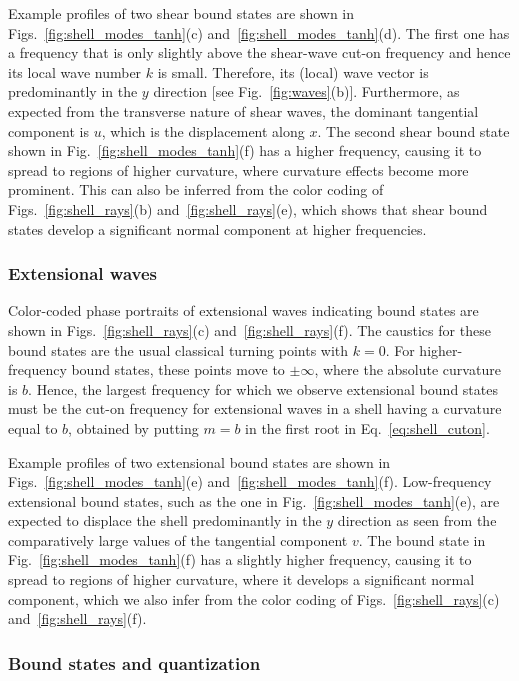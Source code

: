 Example profiles of two shear bound states are shown in Figs.~\ref{fig:shell_modes_tanh}(c) and~\ref{fig:shell_modes_tanh}(d).
The first one has a frequency that is only slightly above the shear-wave cut-on frequency and hence its local wave number $k$ is small.
Therefore, its (local) wave vector is predominantly in the $y$ direction [see Fig.~\ref{fig:waves}(b)].
Furthermore, as expected from the transverse nature of shear waves, the dominant tangential component is $u$, which is the displacement along $x$.
The second shear bound state shown in Fig.~\ref{fig:shell_modes_tanh}(f) has a higher frequency, causing it to spread to regions of higher curvature, where curvature effects become more prominent.
This can also be inferred from the color coding of Figs.~\ref{fig:shell_rays}(b) and~\ref{fig:shell_rays}(e), which shows that shear bound states develop a significant normal component at higher frequencies.

\subsubsection*{Extensional waves}

Color-coded phase portraits of extensional waves indicating bound states are shown in Figs.~\ref{fig:shell_rays}(c) and~\ref{fig:shell_rays}(f).
The caustics for these bound states are the usual classical turning points with $k=0$.
For higher-frequency bound states, these points move to $\pm \infty$, where the absolute curvature is $b$.
Hence, the largest frequency for which we observe extensional bound states must be the cut-on frequency for extensional waves in a shell having a curvature equal to $b$, obtained by putting $m = b$ in the first root in Eq.~\eqref{eq:shell_cuton}.

Example profiles of two extensional bound states are shown in Figs.~\ref{fig:shell_modes_tanh}(e) and~\ref{fig:shell_modes_tanh}(f).
Low-frequency extensional bound states, such as the one in Fig.~\ref{fig:shell_modes_tanh}(e), are expected to displace the shell predominantly in the $y$ direction as seen from the comparatively large values of the tangential component $v$.
The bound state in Fig.~\ref{fig:shell_modes_tanh}(f) has a slightly higher frequency, causing it to spread to regions of higher curvature, where it develops a significant normal component, which we also infer from the color coding of Figs.~\ref{fig:shell_rays}(c) and~\ref{fig:shell_rays}(f).

\subsubsection*{Bound states and quantization}

